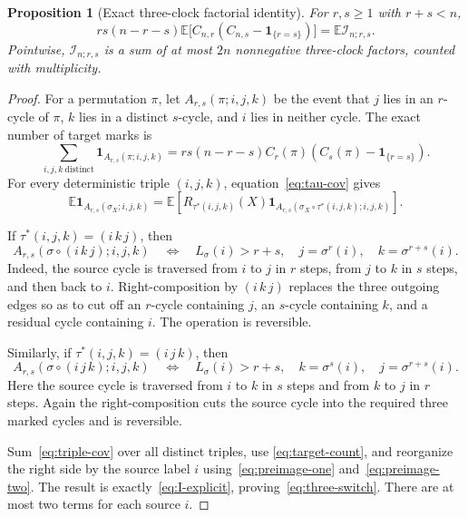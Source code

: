 \documentclass[11pt]{article}
\newtheorem{proposition}[theorem]{Proposition}
\theoremstyle{remark}
\newcommand{\Ee}{\mathbb E}
\newcommand{\one}{\mathbf 1}
\begin{document}
\begin{proposition}[Exact three-clock factorial identity]
\label{prop:three-switch}
For $r,s\geq1$ with $r+s<n$,
\begin{equation}\label{eq:three-switch}
 rs(n-r-s)\Ee\bigl[C_{n,r}(C_{n,s}-\one_{\{r=s\}})\bigr]
 =\Ee\mathcal I_{n;r,s}.
\end{equation}
Pointwise, $\mathcal I_{n;r,s}$ is a sum of at most $2n$ nonnegative
three-clock factors, counted with multiplicity.
\end{proposition}

\begin{proof}
For a permutation $\pi$, let $A_{r,s}(\pi;i,j,k)$ be the event that $j$
lies in an $r$-cycle of $\pi$, $k$ lies in a distinct $s$-cycle, and $i$
lies in neither cycle.  The exact number of target marks is
\begin{equation}\label{eq:target-count}
 \sum_{i,j,k\ \mathrm{distinct}}
 \one_{A_{r,s}(\pi;i,j,k)}
 =rs(n-r-s)C_r(\pi)(C_s(\pi)-\one_{\{r=s\}}).
\end{equation}
For every deterministic triple $(i,j,k)$, equation~\eqref{eq:tau-cov}
gives
\begin{equation}\label{eq:triple-cov}
 \Ee\one_{A_{r,s}(\sigma_X;i,j,k)}
 =\Ee\left[
 R_{\tau^*(i,j,k)}(X)
 \one_{A_{r,s}(\sigma_X\circ\tau^*(i,j,k);i,j,k)}
 \right].
\end{equation}

If $\tau^*(i,j,k)=(i\,k\,j)$, then
\begin{equation}\label{eq:preimage-one}
 A_{r,s}(\sigma\circ(i\,k\,j);i,j,k)
 \quad\Longleftrightarrow\quad
 L_\sigma(i)>r+s,\quad
 j=\sigma^r(i),\quad
 k=\sigma^{r+s}(i).
\end{equation}
Indeed, the source cycle is traversed from $i$ to $j$ in $r$ steps, from
$j$ to $k$ in $s$ steps, and then back to $i$.  Right-composition by
$(i\,k\,j)$ replaces the three outgoing edges so as to cut off an
$r$-cycle containing $j$, an $s$-cycle containing $k$, and a residual cycle
containing $i$.  The operation is reversible.

Similarly, if $\tau^*(i,j,k)=(i\,j\,k)$, then
\begin{equation}\label{eq:preimage-two}
 A_{r,s}(\sigma\circ(i\,j\,k);i,j,k)
 \quad\Longleftrightarrow\quad
 L_\sigma(i)>r+s,\quad
 k=\sigma^s(i),\quad
 j=\sigma^{r+s}(i).
\end{equation}
Here the source cycle is traversed from $i$ to $k$ in $s$ steps and from
$k$ to $j$ in $r$ steps.  Again the right-composition cuts the source cycle
into the required three marked cycles and is reversible.

Sum~\eqref{eq:triple-cov} over all distinct triples, use
\eqref{eq:target-count}, and reorganize the right side by the source label
$i$ using~\eqref{eq:preimage-one} and~\eqref{eq:preimage-two}.  The result
is exactly~\eqref{eq:I-explicit}, proving~\eqref{eq:three-switch}.  There
are at most two terms for each source $i$.
\end{proof}
\end{document}

